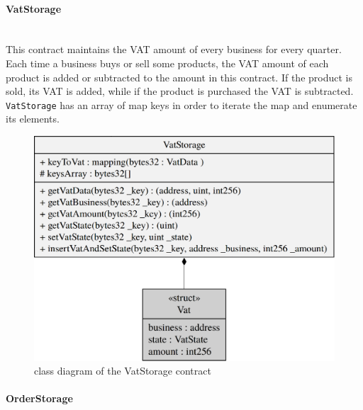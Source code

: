 \paragraph{VatStorage}\mbox{}\\

\noindent This contract maintains the VAT amount of every business for every quarter. Each time a business buys or sell some products, the VAT amount of each product is added or subtracted to the amount in this contract. If the product is sold, its VAT is added, while if the product is purchased the VAT is subtracted. \\
\texttt{VatStorage} has an array of map keys in order to iterate the map and enumerate its elements. 

\begin{figure}[H]
	\centering
	\includegraphics[scale=0.30]{res/images/solidity/vatstorage.png}
	\caption{class diagram of the VatStorage contract}
\end{figure}
\pagebreak

\paragraph{OrderStorage}\mbox{}\\

